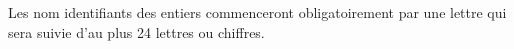 Les nom identifiants des entiers commenceront obligatoirement par une lettre qui sera suivie d'au plus 24 lettres ou chiffres.